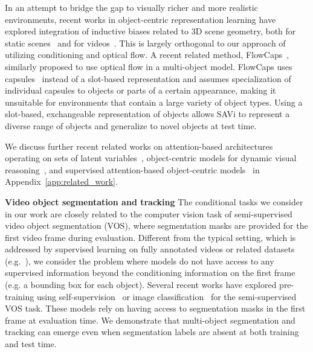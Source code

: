 \documentclass{article}
\newcommand{\modelname}{SAVi\xspace}
\begin{document}
In an attempt to bridge the gap to visually richer and more realistic environments, recent works in object-centric representation learning have explored integration of inductive biases related to 3D scene geometry, both for static scenes~\citep{chen2020object,stelzner2021decomposing} and for videos~\citep{du2020unsupervised,henderson2020unsupervised,harley2021track}. This is largely orthogonal to our approach of utilizing conditioning and optical flow. A recent related method, FlowCaps~\citep{sabour2020unsupervised}, similarly proposed to use optical flow in a multi-object model. FlowCaps uses capsules~\citep{sabour2017dynamic,hinton2018matrix} instead of a slot-based representation and assumes specialization of individual capsules to objects or parts of a certain appearance, making it unsuitable for environments that contain a large variety of object types. Using a slot-based, exchangeable representation of objects allows \modelname to represent a diverse range of objects and generalize to novel objects at test time. 

We discuss further recent related works on attention-based architectures operating on sets of latent variables~\citep{santoro2018relational,goyal2021neural,goyal2021factorizing,goyal2019recurrent,jaegle2021perceiver,jaegle2021perceiverio}, object-centric models for dynamic visual reasoning~\citep{yi2019clevrer,ding2021attention,bar2021compositional}, and supervised attention-based object-centric models~\citep{fuchs2019end,carion2020detr,kamath2021mdetr,meinhardt2021trackformer} in Appendix~\ref{app:related_work}.

\textbf{Video object segmentation and tracking}\quad
The conditional tasks we consider in our work are closely related to the computer vision task of semi-supervised video object segmentation (VOS), where segmentation masks are provided for the first video frame during evaluation. Different from the typical setting, which is addressed by supervised learning on fully annotated videos or related datasets (e.g.~\citealp{caelles2017one,luiten2018premvos}), we consider the problem where models do not have access to any supervised information beyond the conditioning information on the first frame (e.g. a bounding box for each object).
Several recent works have explored pre-training using self-supervision~\citep{li2019joint,jabri2020space,caron2021emerging} or image classification~\citep{zhang2020transductive} for the semi-supervised VOS task. These models rely on having access to segmentation masks in the first frame at evaluation time.  We demonstrate that multi-object segmentation and tracking can emerge even when segmentation labels are absent at both training and test time. 
\end{document}
